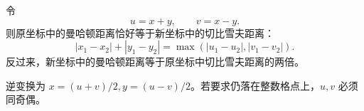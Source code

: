 令
\[
  u=x+y,\qquad v=x-y.
\]
则原坐标中的曼哈顿距离恰好等于新坐标中的切比雪夫距离：
\[
  |x_1-x_2|+|y_1-y_2|
  =\max(|u_1-u_2|,|v_1-v_2|).
\]
反过来，新坐标中的曼哈顿距离等于原坐标中切比雪夫距离的两倍。

逆变换为 $x=(u+v)/2, y=(u-v)/2$。若要求仍落在整数格点上，$u,v$ 必须同奇偶。
